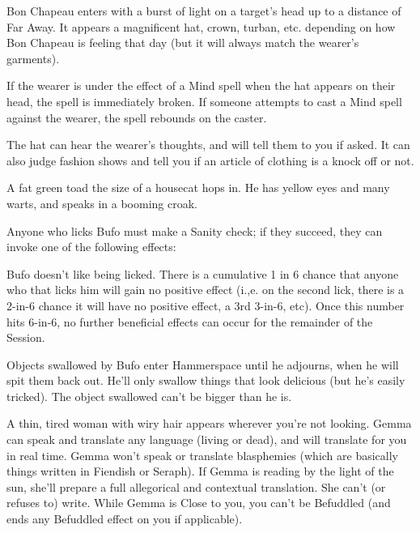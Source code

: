 {

Bon Chapeau enters with a burst of light on a target's head up to a distance of Far Away.  It appears a magnificent hat, crown, turban, etc. depending on how Bon Chapeau is feeling that day (but it will always match the wearer's garments).  

If the wearer is under the effect of a Mind spell when the hat appears on their head, the spell is immediately broken.  If someone attempts to cast a Mind spell against the wearer, the spell rebounds on the caster. 

The hat can hear the wearer's thoughts, and will tell them to you if asked.  It can also judge fashion shows and tell you if an article of clothing is a knock off or not.


A fat green toad the size of a housecat hops in.  He has yellow eyes and many warts, and speaks in a booming croak. 

Anyone who licks Bufo must make a Sanity check; if they succeed, they can invoke one of the following effects:

Bufo doesn't like being licked.  There is a cumulative 1 in 6 chance that anyone who that licks him will gain no positive effect (i.,e.  on the second lick, there is a 2-in-6 chance it will have no positive effect, a 3rd 3-in-6, etc).  Once this number hits 6-in-6, no further beneficial effects can occur for the remainder of the Session.

Objects swallowed by Bufo enter Hammerspace until he adjourns, when he will spit them back out.  He'll only swallow things that look delicious (but he's easily tricked).  The object swallowed can't be bigger than he is.




A thin, tired woman with wiry hair appears wherever you're not looking.  Gemma can speak and translate any language (living or dead), and will translate for you in real time.  Gemma won't speak or translate blasphemies (which are basically things written in Fiendish or Seraph).  If Gemma is reading by the light of the sun, she'll prepare a full allegorical and contextual translation.  She can't (or refuses to) write.  While Gemma is Close to you, you can't be Befuddled (and ends any Befuddled effect on you if applicable).

}

